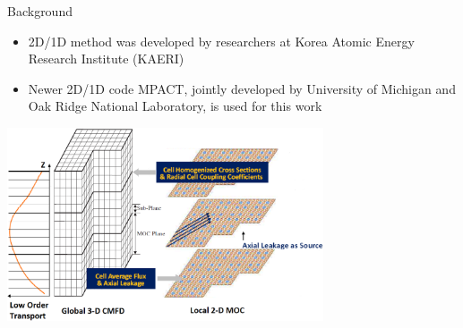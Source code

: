 \begin{frame}[t]{Background}

\vspace{-10pt}
\begin{itemize}
  \item 2D/1D method was developed by researchers at Korea Atomic Energy 
  Research Institute (KAERI) \cite{3DHetWholeCoreTransPlanarMOC,DeCARTTheoryManual,MethodsAndPerformanceOfDecart}
  \item Newer 2D/1D code MPACT, jointly developed by University of Michigan and Oak Ridge National Laboratory, is used for this work \cite{MPACTTheoryManual}
\end{itemize} 
\begin{center}
\includegraphics[width=0.7\textwidth]{../figs/2d1d-subplane.png}
\end{center}
  
\end{frame}


